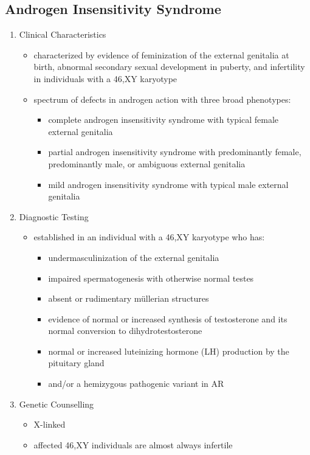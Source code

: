 \documentclass[12pt]{scrartcl}
\begin{document}
\subsection{Androgen Insensitivity Syndrome}
\label{sec:org5068fa7}
\begin{enumerate}
\item Clinical Characteristics
\label{sec:orge88412c}
\begin{itemize}
\item characterized by evidence of feminization of the external genitalia
at birth, abnormal secondary sexual development in puberty, and
infertility in individuals with a 46,XY karyotype
\item spectrum of defects in androgen action with three broad phenotypes:
\begin{itemize}
\item complete androgen insensitivity syndrome with typical
female external genitalia
\item partial androgen insensitivity syndrome with predominantly
female, predominantly male, or ambiguous external genitalia
\item mild androgen insensitivity syndrome with typical male external
genitalia
\end{itemize}
\end{itemize}
\item Diagnostic Testing
\label{sec:org7af9d9e}
\begin{itemize}
\item established in an individual with a 46,XY karyotype who has:
\begin{itemize}
\item undermasculinization of the external genitalia
\item impaired spermatogenesis with otherwise normal testes
\item absent or rudimentary müllerian structures
\item evidence of normal or increased synthesis of testosterone and its
normal conversion to dihydrotestosterone
\item normal or increased luteinizing hormone (LH) production by the
pituitary gland
\item and/or a hemizygous pathogenic variant in AR
\end{itemize}
\end{itemize}
\item Genetic Counselling
\label{sec:orgbe0f922}
\begin{itemize}
\item X-linked
\item affected 46,XY individuals are almost always infertile
\end{itemize}
\end{enumerate}
\end{document}
